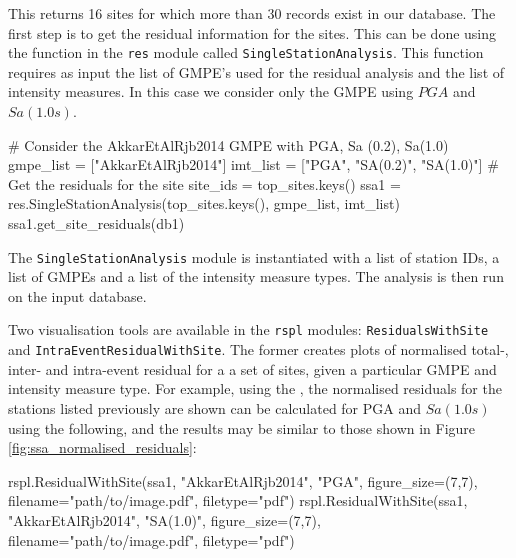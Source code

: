 This returns 16 sites for which more than 30 records exist in our database. The first step is to get the residual information for the sites. This can be done using the function in the \verb=res= module called \verb=SingleStationAnalysis=. This function requires as input the list of GMPE's used for the residual analysis and the list of intensity measures. In this case we consider only the \cite{Akkar_etal2014} GMPE using $PGA$ and $Sa \left( {1.0 s} \right)$.

\begin{python}
# Consider the AkkarEtAlRjb2014 GMPE with PGA, Sa (0.2), Sa(1.0)
gmpe_list = ["AkkarEtAlRjb2014"]
imt_list = ["PGA", "SA(0.2)", "SA(1.0)"]
# Get the residuals for the site
site_ids = top_sites.keys()
ssa1 = res.SingleStationAnalysis(top_sites.keys(),
                                 gmpe_list,
                                 imt_list)
ssa1.get_site_residuals(db1)
\end{python}

The \verb=SingleStationAnalysis= module is instantiated with a list of station IDs, a list of GMPEs and a list of the intensity measure types. The analysis is then run on the input database.

Two visualisation tools are available in the \verb=rspl= modules: \verb=ResidualsWithSite= and \verb=IntraEventResidualWithSite=. The former creates plots of normalised total-, inter- and intra-event residual for a a set of sites, given a particular GMPE and intensity measure type. For example, using the \cite{Akkar_etal2014}, the normalised residuals for the stations listed previously are shown can be calculated for PGA and $Sa \left( {1.0 s} \right)$ using the following, and the results may be similar to those shown in Figure \ref{fig:ssa_normalised_residuals}:

\begin{python}
rspl.ResidualWithSite(ssa1,
                      "AkkarEtAlRjb2014",
                      "PGA",
                      figure_size=(7,7),
                      filename="path/to/image.pdf",
                      filetype="pdf")
rspl.ResidualWithSite(ssa1,
                      "AkkarEtAlRjb2014",
                      "SA(1.0)",
                      figure_size=(7,7),
                      filename="path/to/image.pdf",
                      filetype="pdf")
\end{python}

